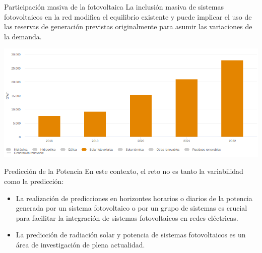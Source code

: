 \documentclass[aspectratio=169, usenames,svgnames,dvipsnames]{beamer}
\begin{document}
\begin{frame}[label={sec:orgb539ca9}]{Participación masiva de la fotovoltaica}
La \alert{inclusión masiva} de sistemas fotovoltaicos en la red \alert{modifica el
equilibrio} existente y puede implicar el uso de las reservas de
generación previstas originalmente para asumir las variaciones de la
demanda.

\begin{center}
\includegraphics[height=0.6\textheight]{../figs/EvolucionGeneracionFV_REE.png}
\end{center}
\end{frame}


\begin{frame}[label={sec:org93bfbab}]{Predicción de la Potencia}
En este contexto, el reto no es tanto la variabilidad como la
\alert{predicción}:

\begin{itemize}
\item La realización de \alert{predicciones en horizontes horarios o diarios} de
la potencia generada por un sistema fotovoltaico o por un grupo de
sistemas es \alert{crucial para facilitar la integración} de sistemas
fotovoltaicos en redes eléctricas.

\item La predicción de radiación solar y potencia de sistemas
fotovoltaicos es un \alert{área de investigación de plena actualidad}.
\end{itemize}
\end{frame}
\end{document}
